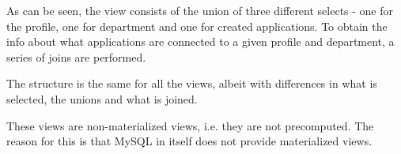 

As can be seen, the view consists of the union of three different selects - one for the profile, one for department and one for created applications. To obtain the info about what applications are connected to a given profile and department, a series of joins are performed.

The structure is the same for all the views, albeit with differences in what is selected, the unions and what is joined.

These views are non-materialized views, i.e. they are not precomputed. The reason for this is that MySQL in itself does not provide materialized views. \cite{fromdual}